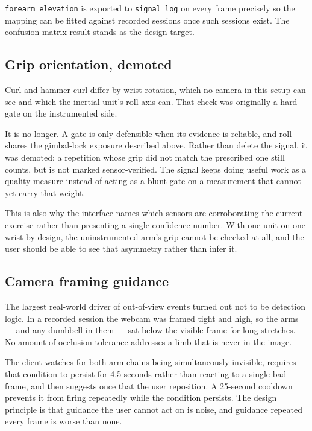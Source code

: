 \documentclass[11pt,a4paper]{article}
\newcommand{\code}[1]{\texttt{\small #1}}
\begin{document}
\code{forearm\_elevation} is exported to \code{signal\_log} on every frame
precisely so the mapping can be fitted against recorded sessions once such
sessions exist. The confusion-matrix result stands as the design target.

\subsection{Grip orientation, demoted}

Curl and hammer curl differ by wrist rotation, which no camera in this setup can
see and which the inertial unit's roll axis can. That check was originally a
hard gate on the instrumented side.

It is no longer. A gate is only defensible when its evidence is reliable, and
roll shares the gimbal-lock exposure described above. Rather than delete the
signal, it was demoted: a repetition whose grip did not match the prescribed one
still counts, but is not marked sensor-verified. The signal keeps doing useful
work as a quality measure instead of acting as a blunt gate on a measurement
that cannot yet carry that weight.

This is also why the interface names which sensors are corroborating the current
exercise rather than presenting a single confidence number. With one unit on one
wrist by design, the uninstrumented arm's grip cannot be checked at all, and the
user should be able to see that asymmetry rather than infer it.

\subsection{Camera framing guidance}

The largest real-world driver of out-of-view events turned out not to be
detection logic. In a recorded session the webcam was framed tight and high, so
the arms --- and any dumbbell in them --- sat below the visible frame for long
stretches. No amount of occlusion tolerance addresses a limb that is never in
the image.

The client watches for both arm chains being simultaneously invisible, requires
that condition to persist for 4.5 seconds rather than reacting to a single bad
frame, and then suggests once that the user reposition. A 25-second cooldown
prevents it from firing repeatedly while the condition persists. The design
principle is that guidance the user cannot act on is noise, and guidance
repeated every frame is worse than none.
\end{document}
